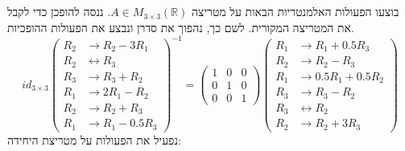 \documentclass[]{article}
\newcommand\R     {\mathbb{R}}
\newcommand\lra       {\leftrightarrow}
\newcommand\mat[2]    {M_{#1\times#2}}
\newcommand\op    {^{-1}}
\newcommand\cl [1]    {\left ( #1 \right )}
\newcommand\dequad    {\!\!\!\!\!\!}
\begin{document}
	\section{}
	בוצעו הפעולות האלמנטריות הבאות על מטריצה $A \in \mat{3}{3}(\R)$. ננסה להופכן כדי לקבל את המטריצה המקורית. לשם כך, נהפוך את סדרן ונבצע את הפעולות ההופכיות. 
	\[ id_{3 \times 3} \cl{\begin{aligned}
			R_2 &\to R_2 - 3R_1 \\
			R_2 &\leftrightarrow R_3 \\
			R_3 &\to R_3 + R_2 \\
			R_1 &\to 2R_1 - R_2 \\
			R_2 &\to R_2 + R_3 \\
			R_1 &\to R_1 - 0.5R_3
	\end{aligned}}\op \dequad = \begin{pmatrix}
	1 & 0 & 0 \\
	0 & 1 & 0 \\
	0 & 0 & 1
\end{pmatrix}\cl{\begin{aligned}
		R_1 &\to R_1 + 0.5R_3 \\
		R_2 &\to R_2 - R_3 \\
		R_1 &\to 0.5R_1 + 0.5R_2 \\
		R_3 &\to R_3 - R_2 \\
		R_3 &\lra R_2 \\
		R_2 &\to R_2 + 3R_3
	\end{aligned}} \]
נפעיל את הפעולות על מטריצת היחידה: 
\end{document}
